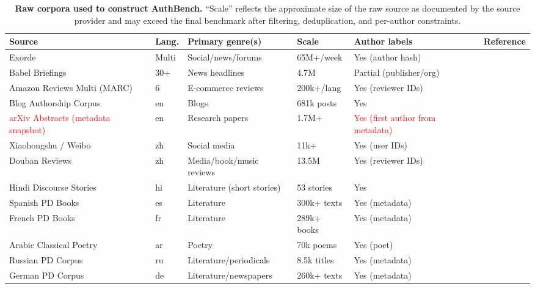 \documentclass[11pt]{article}
\newcommand{\rev}[1]{\textcolor{red}{#1}}
\begin{document}
\begin{table}[h!]
\centering
\small
\setlength{\tabcolsep}{4pt}
\renewcommand{\arraystretch}{1.15}
\begin{tabularx}{\textwidth}{@{}l l l l l X@{}}
\toprule
\textbf{Source} & \textbf{Lang.} & \textbf{Primary genre(s)} & \textbf{Scale} & \textbf{Author labels} & \textbf{Reference} \\
\midrule
Exorde & Multi & Social/news/forums & 65M+/week & Yes (author hash) &
\citep{exorde_social_media_dec2024_week1} \\
Babel Briefings & 30+ & News headlines & 4.7M & Partial (publisher/org) &
\citep{leeb2024babelbriefings,babel_briefings_dataset} \\
Amazon Reviews Multi (MARC) & 6 & E-commerce reviews & 200k+/lang & Yes (reviewer IDs) &
\citep{keung2020marc,amazon_reviews_multi_kaggle} \\
Blog Authorship Corpus & en & Blogs & 681k posts & Yes &
\citep{schler2006blogauthorship,blog_authorship_corpus_hf} \\
\rev{arXiv Abstracts (metadata snapshot)} & en & Research papers & 1.7M+ & \rev{Yes (first author from metadata)} &
\citep{arxiv_bulk_data_access,cornell_arxiv_kaggle} \\
Xiaohongshu / Weibo & zh & Social media & 11k+ & Yes (user IDs) &
\citep{xiaohongshu_aigc_comments_kaggle} \\
Douban Reviews & zh & Media/book/music reviews & 13.5M & Yes (reviewer IDs) &
\citep{douban_reviews_kaggle} \\
Hindi Discourse Stories & hi & Literature (short stories) & 53 stories & Yes &
\citep{dhanwal2020hindi_discourse_modes,hindi_discourse_github} \\
Spanish PD Books & es & Literature & 300k+ texts & Yes (metadata) &
\citep{pleias_spanish_pd_books} \\
French PD Books & fr & Literature & 289k+ books & Yes (metadata) &
\citep{pleias_french_pd_books} \\
Arabic Classical Poetry & ar & Poetry & 70k poems & Yes (poet) &
\citep{arabic_poetry_kaggle} \\
Russian PD Corpus & ru & Literature/periodicals & 8.5k titles & Yes (metadata) &
\citep{pleias_russian_pd} \\
German PD Corpus & de & Literature/newspapers & 260k+ texts & Yes (metadata) &
\citep{pleias_german_pd} \\
\bottomrule
\end{tabularx}
\caption{\textbf{Raw corpora used to construct AuthBench.} ``Scale'' reflects the approximate size of the raw source as documented by the source provider and may exceed the final benchmark after filtering, deduplication, and per-author constraints.}
\label{tab:raw-sources}
\end{table}
\end{document}
